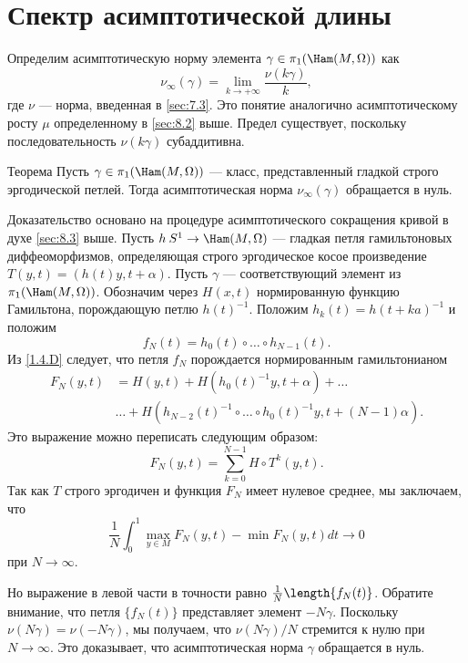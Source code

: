 \section{Спектр асимптотической длины}
Определим асимптотическую норму элемента $\gamma\in\pi_1(\Ham(M, \Omega))$ как
\[\nu_\infty(\gamma)=\lim_{k\to+\infty}\frac{\nu(k\gamma)}{k},\]
где $\nu$ --- норма, введенная в \ref{sec:7.3}. 
Это понятие аналогично асимптотическому росту $\mu$ определенному в \ref{sec:8.2} выше.
Предел существует, поскольку последовательность $\nu(k\gamma)$ субаддитивна.

\begin{thm}{Теорема}\label{11.2.A}
Пусть $\gamma\in\pi_1(\Ham(M,\Omega))$ --- класс, представленный гладкой строго эргодической петлей.
Тогда асимптотическая норма $\nu_\infty ​​(\gamma)$ обращается в нуль.
\end{thm}

Доказательство основано на процедуре асимптотического сокращения кривой в духе \ref{sec:8.3} выше.
Пусть $h\: S^1 \to \Ham(M,\Omega)$ --- гладкая петля гамильтоновых диффеоморфизмов, определяющая строго эргодическое косое произведение $T(y, t) = (h(t)y, t+\alpha)$.
Пусть $\gamma$ --- соответствующий элемент из $\pi_1(\Ham(M, \Omega))$.
Обозначим через $H(x, t)$ нормированную функцию Гамильтона, порождающую петлю $h(t)^{-1}$.
Положим $h_k(t) = h(t + ka)^{-1}$ и положим 
\[f_N(t) = h_0(t) \circ \dots \circ h_{N-1}(t).\]
Из \ref{1.4.D} следует, что петля $f_N$ порождается нормированным гамильтонианом 
\begin{align*}
F_N(y,t)
&=
H(y,t)
+ H(h_0(t)^{-1}y,t+\alpha)
+\dots
\\
&\dots
+
H(h_{N-2} (t)^{-1} \circ \dots\circ h_0(t)^{-1}y, t + (N - 1)\alpha).
\end{align*}
Это выражение можно переписать следующим образом:
\[F_N(y, t) = \sum_{k=0}^{N-1} H\circ T^k(y, t).\]
Так как $T$ строго эргодичен и функция $F_N$ имеет нулевое среднее, мы заключаем, что
\[\frac1N\int_0^1\max_{y\in M}F_N(y, t) - \min F_N(y, t) dt \to 0\]
при $N \to \infty$.

Но выражение в левой части в точности равно $\frac1N\length\{f_N(t)\}$.
Обратите внимание, что петля $\{f_N(t)\}$ представляет элемент $-N\gamma$.
Поскольку $\nu(N\gamma) = \nu(-N\gamma)$, мы получаем, что $\nu(N\gamma)/N$ стремится к нулю при $N \to \infty$.
Это доказывает, что асимптотическая норма $\gamma$ обращается в нуль.

